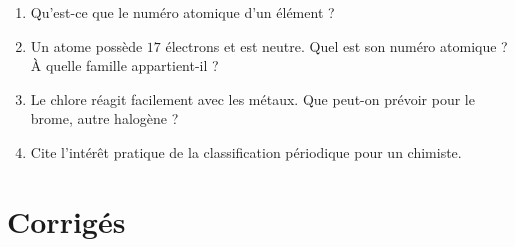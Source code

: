 \begin{enumerate}[label=\arabic*)]
\item Qu'est-ce que le numéro atomique d'un élément ?
\item Un atome possède $17$ électrons et est neutre. Quel est son numéro atomique ? À
quelle famille appartient-il ?
\item Le chlore réagit facilement avec les métaux. Que peut-on prévoir pour le brome,
autre halogène ?
\item Cite l'intérêt pratique de la classification périodique pour un chimiste.
\end{enumerate}

\section{Corrigés}
